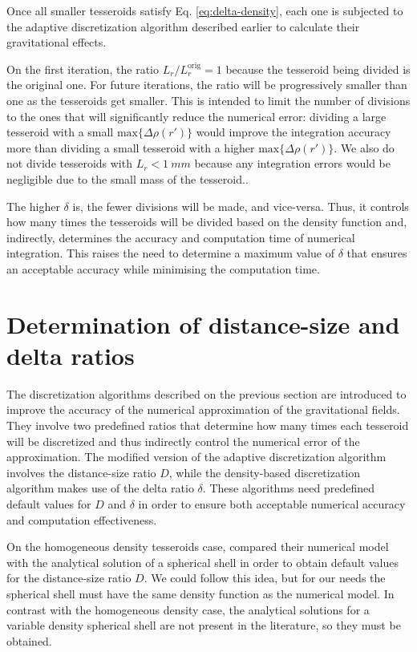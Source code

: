 \documentclass[extra]{gji}
\begin{document}
Once all smaller tesseroids satisfy Eq. \ref{eq:delta-density},
each one is subjected to the adaptive
discretization algorithm described earlier to calculate their gravitational effects.

On the first iteration, the ratio $L_r/L_r^\text{orig} = 1$ because the tesseroid being
divided is the original one.
For future iterations, the ratio will be progressively smaller than one as the
tesseroids get smaller.
This is intended to limit the number of divisions to the ones that will
significantly reduce the numerical error:
dividing a large tesseroid with a small $\text{max}\{ \Delta \rho(r') \}$ would
improve the integration accuracy more than dividing a small tesseroid with a
higher $\text{max}\{ \Delta \rho(r') \}$.
We also do not divide tesseroids with $L_r < 1\ mm$ because any integration errors would
be negligible due to the small mass of the tesseroid..

The higher $\delta$ is, the fewer divisions will be made, and vice-versa.
Thus, it controls how many times the tesseroids will be divided based on the density
function and, indirectly, determines the accuracy and computation time of
numerical integration.
This raises the need to determine a maximum value of $\delta$ that
ensures an acceptable accuracy while minimising the computation time.



\section{Determination of distance-size and delta ratios}

The discretization algorithms described on the previous section are
introduced to improve the accuracy of the numerical approximation of
the gravitational fields.
They involve two predefined ratios that determine how many
times each tesseroid will be discretized and thus indirectly control
the numerical error of the approximation.
The modified version of the adaptive discretization algorithm involves
the distance-size ratio $D$, while the density-based discretization
algorithm makes use of the delta ratio $\delta$.
These algorithms need predefined default values for $D$ and $\delta$
in order to ensure both acceptable numerical accuracy and computation
effectiveness.

On the homogeneous density tesseroids case, \citet{Uieda2016} compared
their numerical model with the analytical solution of a spherical
shell in order to obtain default values for the distance-size ratio
$D$.
We could follow this idea, but for our needs the spherical shell must
have the same density function as the numerical model.
In contrast with the homogeneous density case, the analytical solutions
for a variable density spherical shell are not present in the
literature, so they must be obtained.
\end{document}
